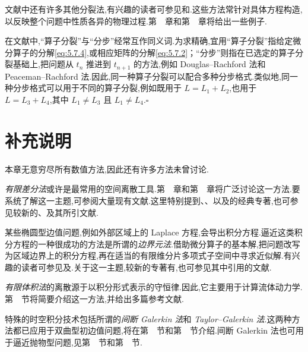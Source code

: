 文献中还有许多其他分裂法,有兴趣的读者可参见和.这些方法常针对具体方程构造,以反映整个问题中性质各异的物理过程.第~~章和第~~章将给出一些例子.

\begin{note}
在文献中,“算子分裂”与“分步”经常互作同义词.为求精确,宜用“算子分裂”指给定微分算子的分解\eqref{eq:5.7.4},或相应矩阵的分解\eqref{eq:5.7.2}；“分步”则指在已选定的算子分裂基础上,把问题从 \(t_n\) 推进到 \(t_{n+1}\) 的方法,例如 Douglas--Rachford 法和 Peaceman--Rachford 法.因此,同一种算子分裂可以配合多种分步格式.类似地,同一种分步格式可以用于不同的算子分裂,例如既用于 \(L=L_1+L_2\),也用于 \(L=L_3+L_4\),其中 \(L_1\ne L_3\) 且 \(L_1\ne L_4\).\hfill\(\square\)
\end{note}

\section{补充说明}\label{sec:5.8}

本章无意穷尽所有数值方法,因此还有许多方法未曾讨论.

\emph{有限差分法}或许是最常用的空间离散工具.第~~章和第~~章将广泛讨论这一方法.要系统了解这一主题,可参阅大量现有文献.这里特别提到、、以及的经典专著,也可参见较新的、及其所引文献.

某些椭圆型边值问题,例如外部区域上的 Laplace 方程,会导出积分方程.逼近这类积分方程的一种很成功的方法是所谓的\emph{边界元法}.借助微分算子的基本解,把问题改写为区域边界上的积分方程,再在适当的有限维分片多项式子空间中寻求近似解.有兴趣的读者可参见及.关于这一主题,较新的专著有,也可参见其中引用的文献.

\emph{有限体积法}的离散源于以积分形式表示的守恒律.因此,它主要用于计算流体动力学.第~~节将简要介绍这一方法,并给出多篇参考文献.

特殊的时空积分技术包括所谓的\emph{间断 Galerkin 法}和 \emph{Taylor--Galerkin 法}.这两种方法都已应用于双曲型初边值问题,将在第~~节和第~~节介绍.间断 Galerkin 法也可用于逼近抛物型问题,见第~~节和第~~节.

